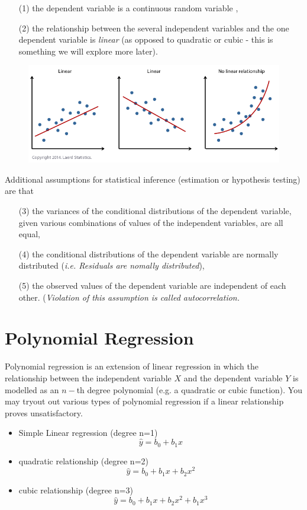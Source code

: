 \documentclass[residuals.tex]{subfiles}
\begin{document}
\begin{itemize}
	\item[(1)] the dependent variable is a continuous random variable ,
	\item[(2)] the relationship between the several independent variables and the one dependent variable is \textit{linear} (as opposed to quadratic or cubic - this is something we will explore more later).
\end{itemize}
\begin{figure}[h!]
\centering
\includegraphics[width=0.7\linewidth]{linear-nonlinear-relationships}
\end{figure}

\noindent Additional assumptions for statistical inference (estimation or hypothesis testing) are that
\begin{itemize}
	\item[(3)] the variances of the conditional distributions of the dependent variable, given various combinations of values of the independent variables, are all equal,
	\item[(4)] the conditional distributions of the dependent variable
	are normally distributed (\textit{i.e. Residuals are nomally distributed}),
	\item[(5)] the observed values of the dependent variable are independent of each other. (\textit{Violation of this assumption is called autocorrelation.} 
\end{itemize}
\newpage
\section*{Polynomial Regression}
Polynomial regression is an extension of linear regression in which the relationship between the independent variable $X$ and the dependent variable $Y$ is modelled as an $n-$th degree polynomial (e.g. a quadratic or cubic function).  You may tryout out various types of polynomial regression if a linear relationship proves unsatisfactory.

\begin{itemize}
\item Simple Linear regression (degree n=1)
\[
\hat{y} = b_0 + b_1 x \]
\item quadratic relationship (degree n=2)
\[
\hat{y} = b_0 + b_1 x + b_2 x^2 \]
\item cubic relationship (degree n=3)
\[
\hat{y} = b_0 + b_1 x + b_2 x^2 + b_1 x^3 \]
\end{itemize}
\end{document}
